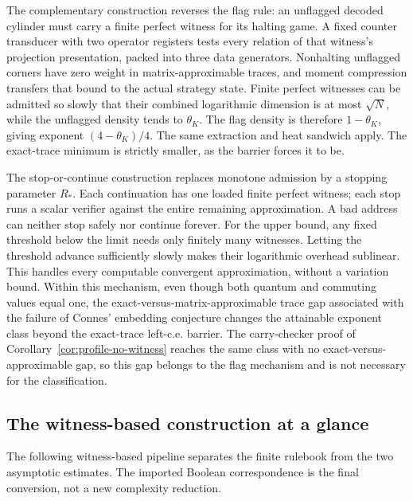 The complementary construction reverses the flag rule: an unflagged decoded cylinder must carry a finite perfect witness for its halting game. A fixed counter transducer with two operator registers tests every relation of that witness's projection presentation, packed into three data generators. Nonhalting unflagged corners have zero weight in matrix-approximable traces, and moment compression transfers that bound to the actual strategy state. Finite perfect witnesses can be admitted so slowly that their combined logarithmic dimension is at most $\sqrt N$, while the unflagged density tends to $\theta_K$. The flag density is therefore $1-\theta_K$, giving exponent $(4-\theta_K)/4$. The same extraction and heat sandwich apply. The exact-trace minimum is strictly smaller, as the barrier forces it to be.

The stop-or-continue construction replaces monotone admission by a stopping parameter $R_*$. Each continuation has one loaded finite perfect witness; each stop runs a scalar verifier against the entire remaining approximation. A bad address can neither stop safely nor continue forever. For the upper bound, any fixed threshold below the limit needs only finitely many witnesses. Letting the threshold advance sufficiently slowly makes their logarithmic overhead sublinear. This handles every computable convergent approximation, without a variation bound. Within this mechanism, even though both quantum and commuting values equal one, the exact-versus-matrix-approximable trace gap associated with the failure of Connes' embedding conjecture changes the attainable exponent class beyond the exact-trace left-c.e. barrier. The carry-checker proof of Corollary~\ref{cor:profile-no-witness} reaches the same class with no exact-versus-approximable gap, so this gap belongs to the flag mechanism and is not necessary for the classification.

\clearpage
\subsection*{The witness-based construction at a glance}
\noindent The following witness-based pipeline separates the finite rulebook from the two asymptotic estimates. The imported Boolean correspondence is the final conversion, not a new complexity reduction.

